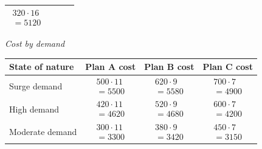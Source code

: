 \begin{ExamProblems}
\begin{center}
\begin{tabular}{l c c c}
					$\begin{array}{l}
						320\cdot 16\\
						= 5120
					\end{array}$ \\
					\bottomrule
			\end{tabular}
			\end{center}
			\begin{center}
				\textit{Cost by demand} \\
				\begin{tabular}{l c c c}
					\toprule
					State of nature & Plan A cost & Plan B cost & Plan C cost \\
					\midrule
					Surge demand &
					$\begin{array}{l}
						500\cdot 11\\
						= 5500
					\end{array}$ &
					$\begin{array}{l}
						620\cdot 9\\
						= 5580
					\end{array}$ &
					$\begin{array}{l}
						700\cdot 7\\
						= 4900
					\end{array}$ \\
					High demand &
					$\begin{array}{l}
						420\cdot 11\\
						= 4620
					\end{array}$ &
					$\begin{array}{l}
						520\cdot 9\\
						= 4680
					\end{array}$ &
					$\begin{array}{l}
						600\cdot 7\\
						= 4200
					\end{array}$ \\
					Moderate demand &
					$\begin{array}{l}
						300\cdot 11\\
						= 3300
					\end{array}$ &
					$\begin{array}{l}
						380\cdot 9\\
						= 3420
					\end{array}$ &
					$\begin{array}{l}
						450\cdot 7\\
						= 3150
					\end{array}$ \\

\end{tabular}
\end{center}
\end{ExamProblems}
